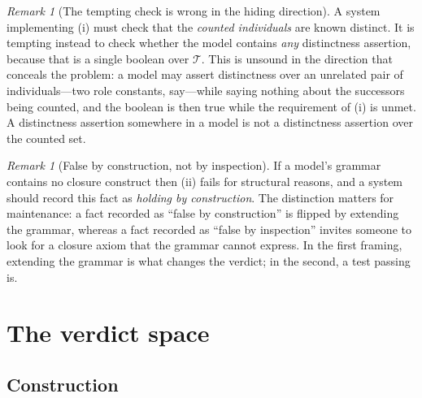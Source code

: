 \documentclass[11pt,a4paper]{article}
\theoremstyle{plain}
\theoremstyle{definition}
\theoremstyle{remark}
\newtheorem{remark}[theorem]{Remark}
\begin{document}
\begin{remark}[The tempting check is wrong in the hiding direction]
\label{rem:una-scope}
A system implementing (i) must check that the
\emph{counted individuals} are known distinct. It is tempting instead to check
whether the model contains \emph{any} distinctness assertion, because that is
a single boolean over $\mathcal{T}$. This is unsound in the direction that
conceals the problem: a model may assert distinctness over an unrelated pair of
individuals---two role constants, say---while saying nothing about the
successors being counted, and the boolean is then true while the requirement of
(i) is unmet. A distinctness assertion somewhere in a model is not a
distinctness assertion over the counted set.
\end{remark}

\begin{remark}[False by construction, not by inspection]
\label{rem:by-construction}
If a model's grammar contains no closure construct then
(ii) fails for structural reasons, and a system
should record this fact as \emph{holding by construction}. The distinction
matters for maintenance: a fact recorded as ``false by construction'' is
flipped by extending the grammar, whereas a fact recorded as ``false by
inspection'' invites someone to look for a closure axiom that the grammar
cannot express. In the first framing, extending the grammar is what changes the
verdict; in the second, a test passing is.
\end{remark}

\section{The verdict space}
\label{sec:verdicts}

\subsection{Construction}
\end{document}
